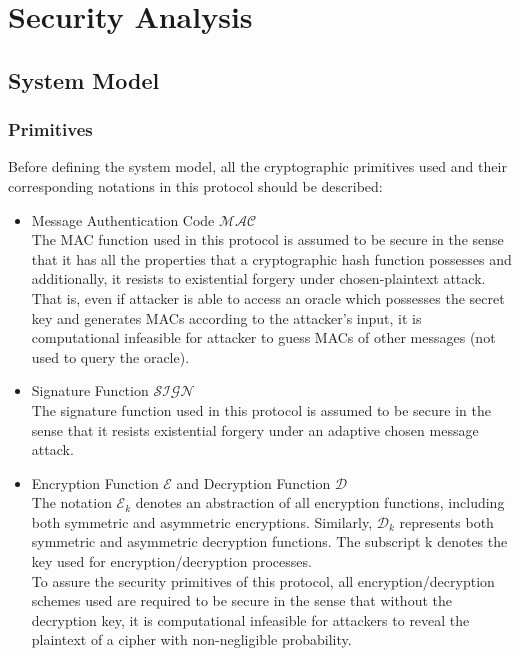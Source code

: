 \documentclass[10pt,a4paper]{article}
\begin{document}
\section*{Security Analysis}
\subsection*{System Model}
\subsubsection*{Primitives}
Before defining the system model, all the cryptographic primitives used and their corresponding notations in this protocol should be described:
\begin{itemize}
\item Message Authentication Code $\mathcal{MAC}$\\
The MAC function used in this protocol is assumed to be secure in the sense that it has all the properties that a cryptographic hash function possesses and additionally, it resists to existential forgery under chosen-plaintext attack. That is, even if attacker is able to access an oracle which possesses the secret key and generates MACs according to the attacker's input, it is computational infeasible for attacker to guess MACs of other messages (not used to query the oracle).

\item Signature Function $\mathcal{SIGN}$\\
The signature function used in this protocol is assumed to be secure in the sense that it resists existential forgery under an adaptive chosen message attack. \cite{goldwasser}

\item Encryption Function $\mathcal{E}$ and Decryption Function $\mathcal{D}$\\
The notation $\mathcal{E}_k$ denotes an abstraction of all encryption functions, including both symmetric and asymmetric encryptions. Similarly, $\mathcal{D}_k$ represents both symmetric and asymmetric decryption functions. The subscript k denotes the key used for encryption/decryption processes.\\
To assure the security primitives of this protocol, all encryption/decryption schemes used are required to be secure in the sense that without the decryption key, it is computational infeasible for attackers to reveal the plaintext of a cipher with non-negligible probability.


\end{itemize}
\end{document}
